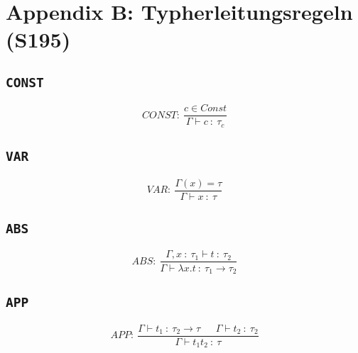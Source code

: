 \section{Appendix B: Typherleitungsregeln (S195)}

\subsection{\texttt{CONST}}
\[CONST:~\frac{c \in Const}{\Gamma \vdash c~:~\tau_c}\]

\subsection{\texttt{VAR}}
\[VAR:~\frac{\Gamma(x)=\tau}{\Gamma \vdash x~:~\tau}\]

\subsection{\texttt{ABS}}
\[ABS:~\frac{\Gamma,x~:~\tau_1 \vdash t~:~\tau_2}{\Gamma \vdash \lambda x.t~:~\tau_1 \rightarrow \tau_2}\]

\subsection{\texttt{APP}}
\[APP:~\frac{\Gamma \vdash t_1~:~\tau_2 \rightarrow \tau~~~~~~~\Gamma\vdash t_2~:~\tau_2}{\Gamma\vdash t_1t_2~:~\tau}\]



